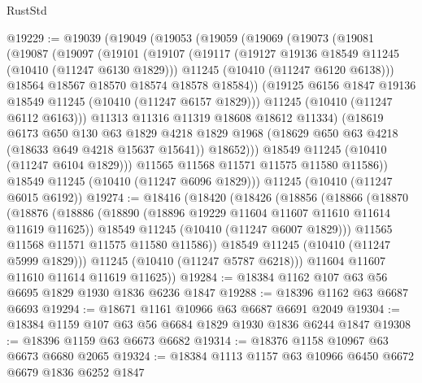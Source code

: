 \begin{lexlean}{RustStd}
\begin{coremodule}
@19229 := @19039
    (@19049
      (@19053
        (@19059
          (@19069
            (@19073
              (@19081
                (@19087
                  (@19097
                    (@19101
                      (@19107
                        (@19117
                          (@19127 @19136 @18549 @11245 (@10410 (@11247 @6130 @1829)))
                          @11245
                          (@10410 (@11247 @6120 @6138)))
                        @18564
                        @18567
                        @18570
                        @18574
                        @18578
                        @18584))
                    (@19125 @6156 @1847 @19136 @18549 @11245 (@10410 (@11247 @6157 @1829)))
                    @11245
                    (@10410 (@11247 @6112 @6163)))
                  @11313
                  @11316
                  @11319
                  @18608
                  @18612
                  @11334)
                (@18619
                  @6173
                  @650
                  @130
                  @63
                  @1829
                  @4218
                  @1829
                  @1968
                  (@18629 @650 @63 @4218 (@18633 @649 @4218 @15637 @15641))
                  @18652)))
            @18549
            @11245
            (@10410 (@11247 @6104 @1829)))
          @11565
          @11568
          @11571
          @11575
          @11580
          @11586))
      @18549
      @11245
      (@10410 (@11247 @6096 @1829)))
    @11245
    (@10410 (@11247 @6015 @6192))
@19274 := @18416
    (@18420
      (@18426
        (@18856
          (@18866
            (@18870
              (@18876
                (@18886
                  (@18890 (@18896 @19229 @11604 @11607 @11610 @11614 @11619 @11625))
                  @18549
                  @11245
                  (@10410 (@11247 @6007 @1829)))
                @11565
                @11568
                @11571
                @11575
                @11580
                @11586))
            @18549
            @11245
            (@10410 (@11247 @5999 @1829)))
          @11245
          (@10410 (@11247 @5787 @6218)))
        @11604
        @11607
        @11610
        @11614
        @11619
        @11625))
@19284 := @18384 @1162 @107 @63 @56 @6695 @1829 @1930 @1836 @6236 @1847
@19288 := @18396 @1162 @63 @6687 @6693
@19294 := @18671 @1161 @10966 @63 @6687 @6691 @2049
@19304 := @18384 @1159 @107 @63 @56 @6684 @1829 @1930 @1836 @6244 @1847
@19308 := @18396 @1159 @63 @6673 @6682
@19314 := @18376 @1158 @10967 @63 @6673 @6680 @2065
@19324 := @18384 @1113 @1157 @63 @10966 @6450 @6672 @6679 @1836 @6252 @1847

\end{coremodule}
\end{lexlean}
